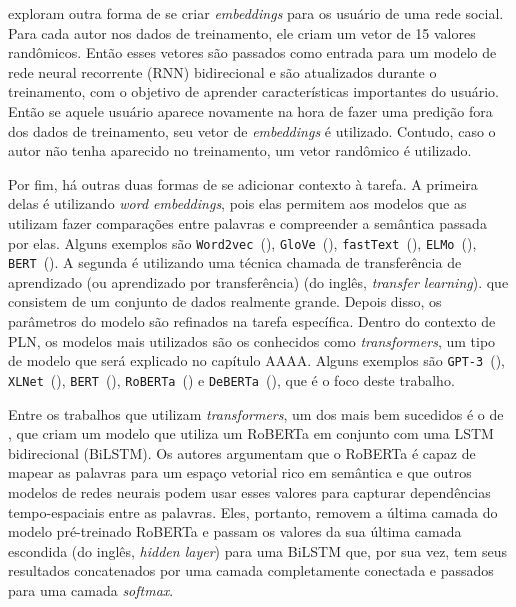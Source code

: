 \cite{kolchinski-potts:2018:representing-social-media-users} exploram outra
forma de se criar \textit{embeddings} para os usuário de uma rede social. Para
cada autor nos dados de treinamento, ele criam um vetor de 15 valores
randômicos. Então esses vetores são passados como entrada para um modelo de rede
neural recorrente (RNN) bidirecional e são atualizados durante o treinamento,
com o objetivo de aprender características importantes do usuário. Então se
aquele usuário aparece novamente na hora de fazer uma predição fora dos dados de
treinamento, seu vetor de \textit{embeddings} é utilizado. Contudo, caso o autor
não tenha aparecido no treinamento, um vetor randômico é utilizado.

Por fim, há outras duas formas de se adicionar contexto à tarefa. A primeira
delas é utilizando \textit{word embeddings}, pois elas permitem aos modelos que
as utilizam fazer comparações entre palavras e compreender a semântica passada
por elas. Alguns exemplos são
\texttt{Word2vec}~(\cite{mikolov-etal:2013:word2vec}),
\texttt{GloVe}~(\cite{pennington-etal:2014:glove}),
\texttt{fastText}~(\cite{bojanowski-etal:2016:fasttext}),
\texttt{ELMo}~(\cite{peters-etal:2018:elmo}),
\texttt{BERT}~(\cite{devlin-etal:2018:bert}).
A segunda é utilizando uma técnica chamada de transferência de aprendizado (ou
aprendizado por transferência) (do inglês, \textit{transfer learning}).
que consistem de um conjunto de dados realmente grande. Depois disso, os
parâmetros do modelo são refinados na tarefa específica. Dentro do contexto de
PLN, os modelos mais utilizados são os conhecidos como \textit{transformers},
um tipo de modelo que será explicado no capítulo AAAA. Alguns exemplos são
\texttt{GPT-3}~(\cite{brown-etal:2020:gpt3}),
\texttt{XLNet}~(\cite{yang-etal:2019:xlnet}),
\texttt{BERT}~(\cite{devlin-etal:2018:bert}),
\texttt{RoBERTa}~(\cite{liu-etal:2019:roberta})
e \texttt{DeBERTa}~(\cite{he-etal:2020:deberta}), que é o foco deste trabalho.

Entre os trabalhos que utilizam \textit{transformers}, um dos mais bem sucedidos
é o de \cite{potamias-etal:2020:transform-sarcasm}, que criam um modelo que
utiliza um RoBERTa em conjunto com uma LSTM bidirecional (BiLSTM). Os autores
argumentam que o RoBERTa é capaz de mapear as palavras para um espaço vetorial
rico em semântica e que outros modelos de redes neurais podem usar esses valores
para capturar dependências tempo-espaciais entre as palavras. Eles, portanto,
removem a última camada do modelo pré-treinado RoBERTa e passam os valores da
sua última camada escondida (do inglês, \textit{hidden layer}) para uma BiLSTM
que, por sua vez, tem seus resultados concatenados por uma camada completamente
conectada e passados para uma camada \textit{softmax}.
